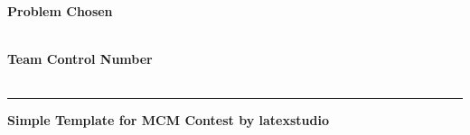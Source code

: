 \documentclass[../mcmpaper]{subfiles}
\begin{document}
	\thispagestyle{empty}
	\begingroup
	\setlength{\parindent}{0pt}
	\begin{minipage}[t]{0.33\linewidth}
		\bfseries\centering%
		Problem Chosen\\[0.7pc]
		{\Huge\textbf{\problem}}\\[2.8pc]
	\end{minipage}%
	\begin{minipage}[t]{0.33\linewidth}
		\centering%
		\textbf{\headset}%
	\end{minipage}%
	\begin{minipage}[t]{0.33\linewidth}
		\centering\bfseries%
		Team Control Number\\[0.7pc]
		{\Huge\textbf{\MCMcontrol}}\\[2.8pc]
	\end{minipage}\par
	\rule{\linewidth}{0.8pt}\par
	\par
	\endgroup
	
	\bigskip
	
	\centerline{\Large\bfseries Simple Template  for MCM Contest by latexstudio}
	
	\begin{abstract}{Summary}
		aaaaaa\lipsum[1]
	\end{abstract}
\end{document}
